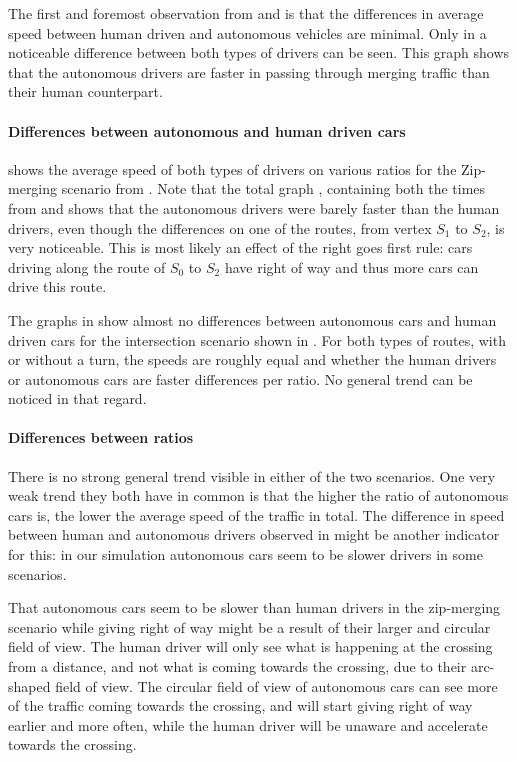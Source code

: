 The first and foremost observation from  and  is that the differences in average speed between human driven and autonomous vehicles are minimal. Only in  a noticeable difference between both types of drivers can be seen. This graph shows that the autonomous drivers are faster in passing through merging traffic than their human counterpart.

\paragraph{Differences between autonomous and human driven cars}
 shows the average speed of both types of drivers on various ratios for the Zip-merging scenario from . Note that the total graph , containing both the times from  and  shows that the autonomous drivers were barely faster than the human drivers, even though the differences on one of the routes, from vertex $S_1$ to $S_2$, is very noticeable. This is most likely an effect of the right goes first rule: cars driving along the route of $S_0$ to $S_2$ have right of way and thus more cars can drive this route.

The graphs in  show almost no differences between autonomous cars and human driven cars for the intersection scenario shown in . For both types of routes, with or without a turn, the speeds are roughly equal and whether the human drivers or autonomous cars are faster differences per ratio. No general trend can be noticed in that regard.

\paragraph{Differences between ratios}
There is no strong general trend visible in either of the two scenarios. One very weak trend they both have in common is that the higher the ratio of autonomous cars is, the lower the average speed of the traffic in total. The difference in speed between human and autonomous drivers observed in  might be another indicator for this: in our simulation autonomous cars seem to be slower drivers in some scenarios.

That autonomous cars seem to be slower than human drivers in the zip-merging scenario while giving right of way might be a result of their larger and circular field of view. The human driver will only see what is happening at the crossing from a distance, and not what is coming towards the crossing, due to their arc-shaped field of view. The circular field of view of autonomous cars can see more of the traffic coming towards the crossing, and will start giving right of way earlier and more often, while the human driver will be unaware and accelerate towards the crossing.